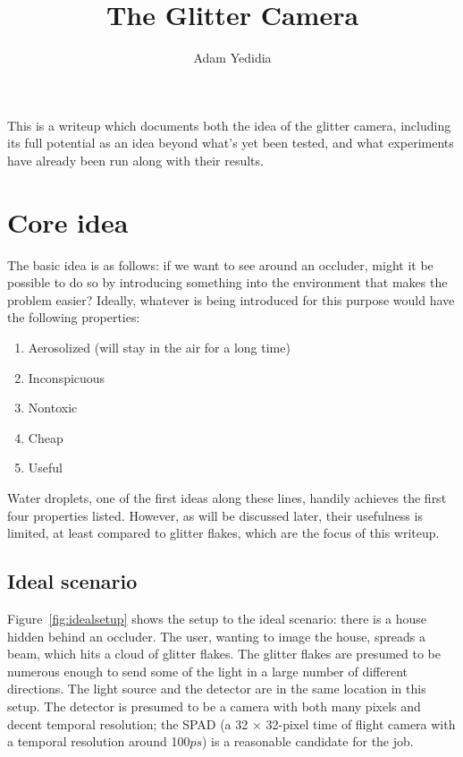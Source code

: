 \documentclass[11pt]{article}
\title{The Glitter Camera}
\author{Adam Yedidia}
\begin{document}
    
\maketitle

This is a writeup which documents both the idea of the glitter camera, including its full potential as an idea beyond what's yet been tested, and what experiments have already been run along with their results.

\section{Core idea}

The basic idea is as follows: if we want to see around an occluder, might it be possible to do so by introducing something into the environment that makes the problem easier? Ideally, whatever is being introduced for this purpose would have the following properties:

\begin{enumerate}
    \item Aerosolized (will stay in the air for a long time)
    \item Inconspicuous
    \item Nontoxic
    \item Cheap
    \item Useful
\end{enumerate}

Water droplets, one of the first ideas along these lines, handily achieves the first four properties listed. However, as will be discussed later, their usefulness is limited, at least compared to glitter flakes, which are the focus of this writeup.

\subsection{Ideal scenario}

Figure~\ref{fig:idealsetup} shows the setup to the ideal scenario: there is a house hidden behind an occluder. The user, wanting to image the house, spreads a beam, which hits a cloud of glitter flakes. The glitter flakes are presumed to be numerous enough to send some of the light in a large number of different directions. The light source and the detector are in the same location in this setup. The detector is presumed to be a camera with both many pixels and decent temporal resolution; the SPAD (a 32 $\times$ 32-pixel time of flight camera with a temporal resolution around 100$ps$) is a reasonable candidate for the job.
\end{document}
